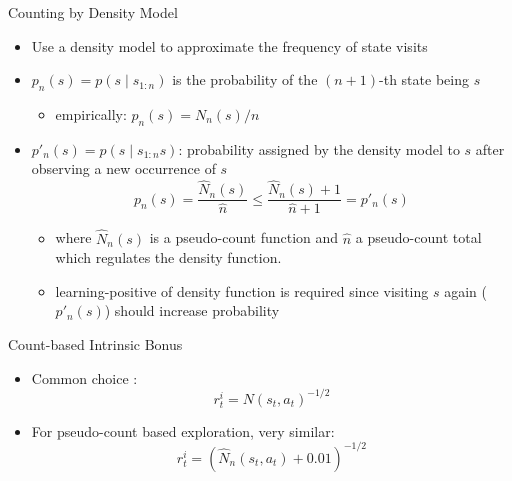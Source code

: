 \begin{frame}[c]{Counting by Density Model }
	
	\begin{itemize}
		\item Use a density model to approximate the frequency of state visits
		\item $p_n(s) = p(s \mid s_{1:n})$ is the probability of the $(n+1)$-th state being $s$
		\begin{itemize}
			\item empirically: $p_n(s) = N_n(s) / n$
		\end{itemize}
		\item $p'_n(s) = p(s \mid s_{1:n} s)$: probability assigned by the density model to $s$ after observing a new occurrence of $s$
		$$p_n(s) =  \frac{\hat{N}_n(s)}{\hat{n}} \leq \frac{\hat{N}_n(s) + 1}{\hat{n} + 1} = p'_n(s)$$
		\begin{itemize}
			\item where $\hat{N}_n(s)$ is a pseudo-count function and $\hat{n}$ a pseudo-count total which regulates the density function.
			\item learning-positive of density function is required since visiting $s$ again ($p'_n(s)$) should increase probability
		\end{itemize}
	\end{itemize}
	
\end{frame}
\begin{frame}[c]{Count-based Intrinsic Bonus}
	
	\begin{itemize}
		\item Common choice :
		$$r_t^i = N(s_t, a_t)^{-1/2}$$
		\item For pseudo-count based exploration, very similar:
		$$r_t^i = (\hat{N}_n (s_t, a_t) + 0.01)^{-1/2} $$
	\end{itemize}
	
\end{frame}

